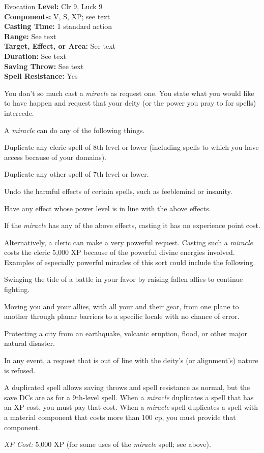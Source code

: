 {Evocation}
{
	\textbf{Level:}
	Clr 9, Luck 9\\
	\textbf{Components:}
	V, S, XP; see text\\
	\textbf{Casting Time:}
	1 standard action\\
	\textbf{Range:}
	See text\\
	\textbf{Target, Effect, or Area:}
	See text\\
	\textbf{Duration:}
	See text\\
	\textbf{Saving Throw:}
	See text\\
	\textbf{Spell Resistance:}
	Yes\\
}
{
	You don't so much cast a \emph{miracle} as request one. You state what you would like to have happen and request that your deity (or the power you pray to for spells) intercede.

	A \emph{miracle} can do any of the following things.

	\begin{itemize*}
	\item Duplicate any cleric spell of 8th level or lower (including spells to which you have access because of your domains).
	\item Duplicate any other spell of 7th level or lower.
	\item Undo the harmful effects of certain spells, such as feeblemind or insanity.
	\item Have any effect whose power level is in line with the above effects.
	\end{itemize*}

	If the \emph{miracle} has any of the above effects, casting it has no experience point cost.

	Alternatively, a cleric can make a very powerful request. Casting such a \emph{miracle} costs the cleric 5,000 XP because of the powerful divine energies involved. Examples of especially powerful miracles of this sort could include the following.

	\begin{itemize*}
	\item Swinging the tide of a battle in your favor by raising fallen allies to continue fighting.
	\item Moving you and your allies, with all your and their gear, from one plane to another through planar barriers to a specific locale with no chance of error.
	\item Protecting a city from an earthquake, volcanic eruption, flood, or other major natural disaster.
	\end{itemize*}

	In any event, a request that is out of line with the deity's (or alignment's) nature is refused.

	A duplicated spell allows saving throws and spell resistance as normal, but the save DCs are as for a 9th-level spell. When a \emph{miracle} duplicates a spell that has an XP cost, you must pay that cost. When a \emph{miracle} spell duplicates a spell with a material component that costs more than 100 cp, you must provide that component.

	\textit{XP Cost:}
	5,000 XP (for some uses of the \emph{miracle} spell; see above).

}
